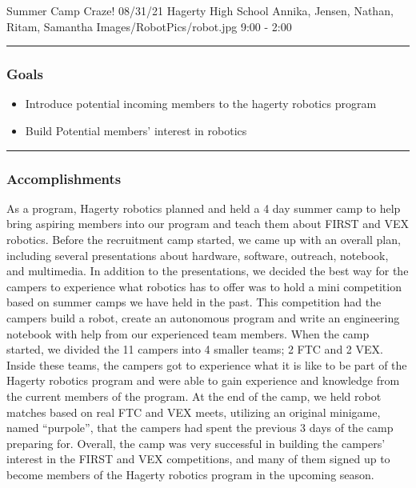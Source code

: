 \insertmeeting 
	{Summer Camp Craze!} 
	{08/31/21}
	{Hagerty High School}
	{Annika, Jensen, Nathan, Ritam, Samantha}
	{Images/RobotPics/robot.jpg}
	{9:00 - 2:00}
	
\noindent\hfil\rule{\textwidth}{.4pt}\hfil
\subsubsection*{Goals}
\begin{itemize}
    \item Introduce potential incoming members to the hagerty robotics program
    \item Build Potential members' interest in robotics

\end{itemize} 

\noindent\hfil\rule{\textwidth}{.4pt}\hfil

\subsubsection*{Accomplishments}
As a program, Hagerty robotics planned and held a 4 day summer camp to help bring aspiring members into our program and teach them about FIRST and VEX robotics. Before the recruitment camp started, we came up with an overall plan, including several presentations about hardware, software, outreach, notebook, and multimedia. In addition to the presentations, we decided the best way for the campers to experience what robotics has to offer was to hold a mini competition based on summer camps we have held in the past. This competition had the campers build a robot, create an autonomous program and write an engineering notebook with help from our experienced team members. When the camp started, we divided the 11 campers into 4 smaller teams; 2 FTC and 2 VEX. Inside these teams, the campers got to experience what it is like to be part of the Hagerty robotics program and were able to gain experience and knowledge from the current members of the program. At the end of the camp, we held robot matches based on real FTC and VEX meets, utilizing an original minigame, named “purpole”, that the campers had spent the previous 3 days of the camp preparing for. Overall, the camp was very successful in building the campers’ interest in the FIRST and VEX competitions, and many of them signed up to become members of the Hagerty robotics program in the upcoming season.

